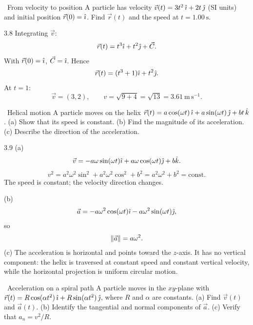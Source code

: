 \begin{exercise}{\core\ From velocity to position}
A particle has velocity $\vec v(t)=3t^2\,\hat{\imath}+2t\,\hat{\jmath}$ (SI units) and initial
position $\vec r(0)=\hat{\imath}$. Find $\vec r(t)$ and the speed at
$t=1.00\ \mathrm{s}$.
\end{exercise}

\begin{tabletworkspace}[6.5cm]
\end{tabletworkspace}

\begin{solution}{3.8}
Integrating $\vec v$:
\[
\vec r(t)=t^3\hat{\imath}+t^2\hat{\jmath}+\vec C.
\]
With $\vec r(0)=\hat{\imath}$, $\vec C=\hat{\imath}$. Hence
\[
\vec r(t)=(t^3+1)\hat{\imath}+t^2\hat{\jmath}.
\]
At $t=1$:
\[
\vec v=(3,2),\qquad v=\sqrt{9+4}=\sqrt{13}=3.61\ \mathrm{m\,s^{-1}}.
\]
\end{solution}

\begin{exercise}{\mastery\ Helical motion}
A particle moves on the helix
$\vec r(t)=a\cos(\omega t)\,\hat{\imath}+a\sin(\omega t)\,\hat{\jmath}+bt\,\hat{k}$.
(a) Show that its speed is constant.
(b) Find the magnitude of its acceleration.
(c) Describe the direction of the acceleration.
\end{exercise}

\begin{tabletworkspace}[6.5cm]
\end{tabletworkspace}

\begin{solution}{3.9}
(a)
\[
\vec v=-a\omega\sin(\omega t)\hat{\imath}+a\omega\cos(\omega t)\hat{\jmath}+b\hat{k}.
\]
\[
v^2=a^2\omega^2\sin^2+a^2\omega^2\cos^2+b^2
=a^2\omega^2+b^2=\text{const}.
\]
The speed is constant; the velocity direction changes.

(b)
\[
\vec a=-a\omega^2\cos(\omega t)\hat{\imath}-a\omega^2\sin(\omega t)\hat{\jmath},
\]
so
\[
\left\lVert \vec a \right\rVert=a\omega^2.
\]
(c) The acceleration is horizontal and points toward the $z$-axis. It has no
vertical component: the helix is traversed at constant speed and constant
vertical velocity, while the horizontal projection is uniform circular motion.
\end{solution}

\begin{exercise}{\mastery\ Acceleration on a spiral path}
A particle moves in the $xy$-plane with
$\vec r(t)=R\cos(\alpha t^2)\,\hat{\imath}+R\sin(\alpha t^2)\,\hat{\jmath}$, where $R$ and
$\alpha$ are constants.
(a) Find $\vec v(t)$ and $\vec a(t)$.
(b) Identify the tangential and normal components of $\vec a$.
(c) Verify that $a_n=v^2/R$.
\end{exercise}

